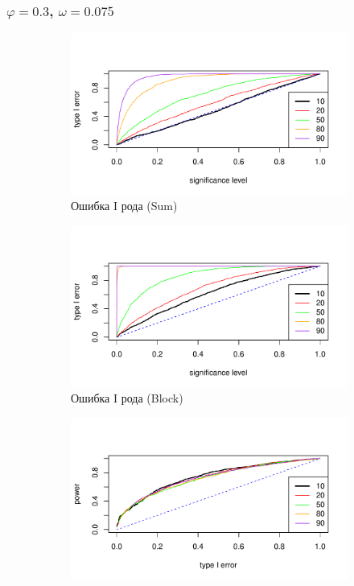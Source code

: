 \documentclass[specialist,
substylefile = spbu_report.rtx,
subf,href,colorlinks=true, 12pt]{disser}
\theoremstyle{definition}
\begin{document}
\subsubsection{$\varphi=0.3$, $\omega=0.075$}
\begin{figure}[h!]
	\captionsetup[subfigure]{justification=Centering}
	\begin{subfigure}[t]{0.5\textwidth}
		\centering
		\includegraphics[width=\textwidth]{img/type1error_sum_ev_phi3.pdf}
		\caption{Ошибка I рода (Sum)}
		\label{fig:sum_ev_phi3}
	\end{subfigure}\hspace{\fill}
	\begin{subfigure}[t]{0.5\textwidth}
		\centering
		\includegraphics[width=\textwidth]{img/type1error_block_ev_phi3.pdf}
		\caption{Ошибка I рода (Block)}
	\end{subfigure}
	\bigskip
	\begin{subfigure}[t]{0.5\textwidth}
		\centering
		\includegraphics[width=\textwidth]{img/roc_sum_ev_phi3_omega0075.pdf}

\end{subfigure}
\end{figure}
\end{document}
